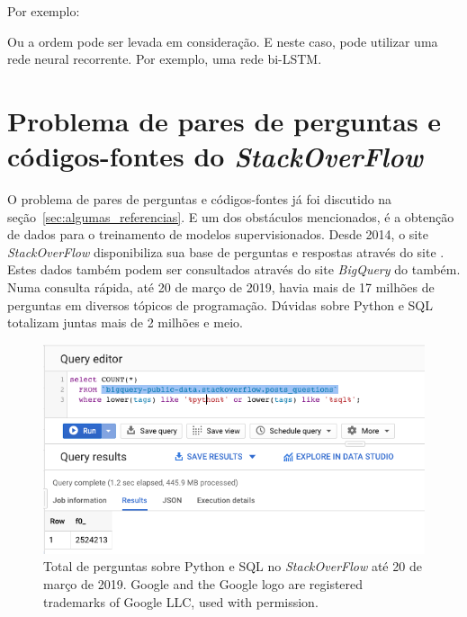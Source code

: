 

Por exemplo:




Ou a ordem pode ser levada em consideração. E neste caso, pode utilizar uma rede neural recorrente. Por exemplo, uma rede bi-LSTM. 


\section{Problema de pares de perguntas e códigos-fontes do \textit{StackOverFlow}}

O problema de pares de perguntas e códigos-fontes já foi discutido na seção~\ref{sec:algumas_referencias}. E um dos obstáculos mencionados, é a obtenção de dados para o treinamento de modelos supervisionados. Desde 2014, o site \textit{StackOverFlow} disponibiliza sua base de perguntas e respostas através do site \cite{sof-2019}. Estes dados também podem ser consultados através do site \textit{BigQuery} do \cite{bigquery-2019} também. Numa consulta rápida, até 20 de março de 2019, havia mais de 17 milhões de perguntas em diversos tópicos de programação. Dúvidas sobre Python e SQL totalizam juntas mais de 2 milhões e meio.

\begin{figure}[h]
\includegraphics[width=12cm]{figuras/cap-problema/post-questions-python-sql-total.png}
\caption{Total de perguntas sobre Python e SQL no \textit{StackOverFlow} até 20 de março de 2019. Google and the Google logo are registered trademarks of Google LLC, used with permission.}
\label{fig:bigquery-total-questions-python-sql-stackoverflow}
\end{figure}

